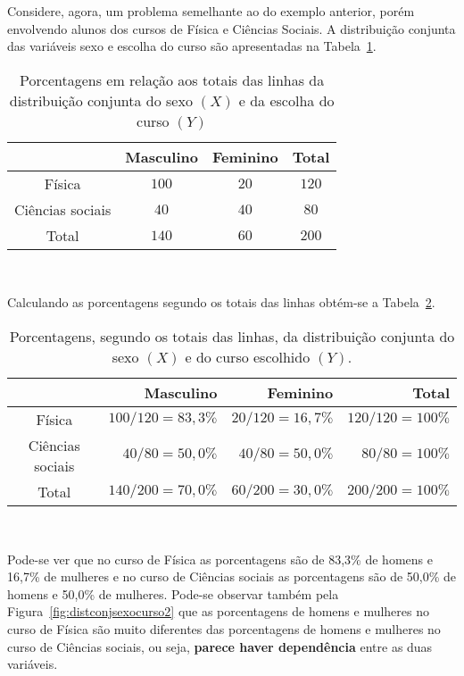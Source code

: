 \documentclass[11pt,fleqn]{book} %
\begin{document}
\begin{example} \label{exemp:distconjsexo}

Considere, agora, um problema semelhante ao do exemplo anterior, porém envolvendo alunos dos cursos de Física e Ciências Sociais. A distribuição conjunta das variáveis sexo e escolha do curso são apresentadas na Tabela~\ref{tab:distconjsexocurso3}.\\

\begin{table}[h]
\caption{Porcentagens em relação aos totais das linhas da distribuição conjunta do sexo $(X)$ e da escolha do curso $(Y)$}
	\label{tab:distconjsexocurso3} 
	\vspace{-0.1cm}
	\centering
	\begin{tabular}{c | c c | c}
	\toprule
	\backslashbox{$\bm Y$}{$\bm X$} & \textbf{Masculino} & \textbf{Feminino} & \textbf{Total} \\
	\midrule
	Física & $100$ & $20$ & $120$ \\
	Ciências sociais & $40$ & $40$ & $80$ \\
	\midrule
	Total & $140$ & $60$ & $200$ \\
	\bottomrule
	\end{tabular} \\
\end{table}

Calculando as porcentagens segundo os totais das linhas obtém-se a Tabela~\ref{tab:distconjsexocurso4}. \\


\begin{table}[h]
\caption{Porcentagens, segundo os totais das linhas, da distribuição conjunta do sexo $(X)$ e do curso escolhido $(Y)$.}
	\label{tab:distconjsexocurso4} 
	\vspace{-0.1cm}
	\centering
	\begin{tabular}{c | r r | r}
	\toprule
	\backslashbox{$\bm Y$}{$\bm X$} & \textbf{Masculino} & \textbf{Feminino} & \textbf{Total} \\
	\midrule
	Física & $100/120=83,3\%$ & $20/120=16,7\%$ & $120/120=100\%$ \\
	Ciências sociais & $40/80=50,0\%$ & $40/80=50,0\%$ & $80/80=100\%$ \\
	\midrule
	Total & $140/200=70,0\%$ & $60/200=30,0\%$ & $200/200=100\%$ \\
	\bottomrule
	\end{tabular} \\
\end{table}


Pode-se ver que no curso de Física as porcentagens são de 83,3\% de homens e 16,7\% de mulheres e no curso de Ciências sociais as porcentagens são de 50,0\% de homens e 50,0\% de mulheres.  Pode-se observar também pela Figura~\ref{fig:distconjsexocurso2} que as porcentagens de homens e mulheres no curso de Física são muito diferentes das porcentagens de homens e mulheres no curso de Ciências sociais, ou seja, {\bf parece haver dependência} entre as duas variáveis.


\end{example}
\end{document}
